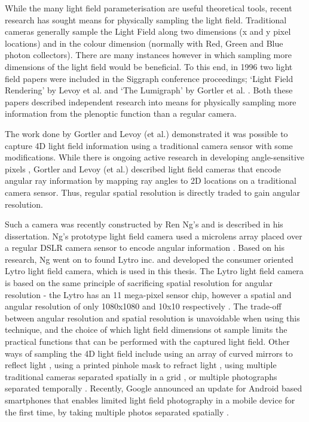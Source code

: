 While the many light field parameterisation are useful theoretical tools, recent research has sought means for physically sampling the light field.
Traditional cameras generally sample the Light Field along two dimensions (x and y pixel locations) and in the colour dimension (normally with Red, Green and Blue photon collectors).
There are many instances however in which sampling more dimensions of the light field would be beneficial.
To this end, in 1996 two light field papers were included in the Siggraph conference proceedings; \enquote*{Light Field Rendering} by Levoy et al. and \enquote*{The Lumigraph} by Gortler et al. \cite{levoy1996light, gortler1996lumigraph}.
Both these papers described independent research into means for physically sampling more information from the plenoptic function than a regular camera.

The work done by Gortler and Levoy (et al.) demonstrated it was possible to capture 4D light field information using a traditional camera sensor with some modifications.
While there is ongoing active research in developing angle-sensitive pixels \cite{wang2009angle, wang2011angle, wang2012angle}, Gortler and Levoy (et al.) described light field cameras that encode angular ray information by mapping ray angles to 2D locations on a traditional camera sensor.
Thus, regular spatial resolution is directly traded to gain angular resolution.

Such a camera was recently constructed by Ren Ng's and is described in his dissertation.
Ng's prototype light field camera used a microlens array placed over a regular DSLR camera sensor to encode angular information \cite{ng2006digital}.
Based on his research, Ng went on to found Lytro inc. and developed the consumer oriented Lytro light field camera, which is used in this thesis.
The Lytro light field camera is based on the same principle of sacrificing spatial resolution for angular resolution - the Lytro has an 11 mega-pixel sensor chip, however a spatial and angular resolution of only 1080x1080 and 10x10 respectively \cite{lytro2014techspecs}.
The trade-off between angular resolution and spatial resolution is unavoidable when using this technique, and the choice of which light field dimensions ot sample limits the practical functions that can be performed with the captured light field.
Other ways of sampling the 4D light field include using an array of curved mirrors to reflect light \cite{nayar2004programmable}, using a printed pinhole mask to refract light \cite{veeraraghavan2007dappled}, using multiple traditional cameras separated spatially in a grid \cite{wilburn2005high}, or multiple photographs separated temporally \cite{levoy1996light}.
Recently, Google announced an update for Android based smartphones that enables limited light field photography in a mobile device for the first time, by taking multiple photos separated spatially \cite{google2014lensblur}.

